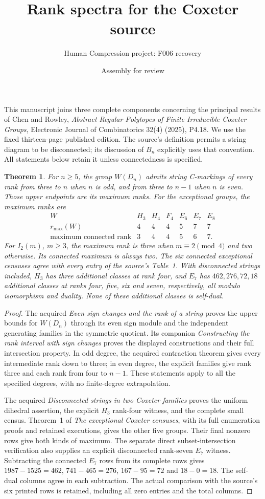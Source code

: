 \documentclass[11pt,a4paper]{article}
\title{Rank spectra for the Coxeter source}
\author{Human Compression project: F006 recovery}
\date{Assembly for review}
\newtheorem{theorem}{Theorem}
\begin{document}
\maketitle
This manuscript joins three complete components concerning the principal
results of Chen and Rowley, \emph{Abstract Regular Polytopes of Finite
Irreducible Coxeter Groups}, Electronic Journal of Combinatorics 32(4)
(2025), P4.18. We use the fixed thirteen-page published edition.
The source's definition permits a string diagram to be disconnected;
its discussion of $B_n$ explicitly uses that convention. All statements
below retain it unless connectedness is specified.

\begin{theorem}
For $n\ge5$, the group $W(D_n)$ admits string C-markings of every
rank from three to $n$ when $n$ is odd, and from three to $n-1$
when $n$ is even. Those upper endpoints are its maximum ranks.
For the exceptional groups, the maximum ranks are
\[
\begin{array}{c|rrrrrr}
W&H_3&H_4&F_4&E_6&E_7&E_8\\\hline
r_{\max}(W)&4&4&4&5&7&7\\
\text{maximum connected rank}&3&4&4&5&6&7.
\end{array}
\]
For $I_2(m)$, $m\ge3$, the maximum rank is three when
$m\equiv2\pmod4$ and two otherwise. Its connected maximum
is always two. The six connected exceptional censuses agree
with every entry of the source's Table~1. With disconnected
strings included, $H_3$ has three additional classes at rank
four, and $E_7$ has $462,276,72,18$ additional classes at ranks
four, five, six and seven, respectively, all modulo isomorphism
and duality. None of these additional classes is self-dual.
\end{theorem}
\begin{proof}
The acquired \emph{Even sign changes and the rank of a string} proves the
upper bounds for $W(D_n)$ through its even sign module and the
independent generating families in the symmetric quotient. Its
companion \emph{Constructing the rank interval with sign changes}
proves the displayed constructions and their full intersection
property. In odd degree, the acquired contraction theorem gives
every intermediate rank down to three; in even degree, the
explicit families give rank three and each rank from four to
$n-1$. These statements apply to all the specified degrees, with
no finite-degree extrapolation.

The acquired \emph{Disconnected strings in two Coxeter families}
proves the uniform dihedral assertion, the explicit $H_3$
rank-four witness, and the complete small census. Theorem~1
of \emph{The exceptional Coxeter censuses}, with its full
enumeration proofs and retained executions, gives the other five
groups. Their final nonzero rows give both kinds of maximum.
The separate direct subset-intersection verification also supplies
an explicit disconnected rank-seven $E_7$ witness. Subtracting
the connected $E_7$ rows from its complete rows gives
$1987-1525=462$, $741-465=276$, $167-95=72$ and $18-0=18$.
The self-dual columns agree in each subtraction. The actual
comparison with the source's six printed rows is retained,
including all zero entries and the total columns.
\end{proof}
\end{document}
